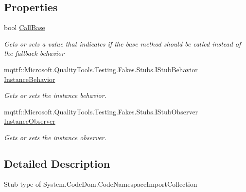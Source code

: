 \subsection*{Properties}
\begin{DoxyCompactItemize}
\item 
bool \hyperlink{class_system_1_1_code_dom_1_1_fakes_1_1_stub_code_namespace_import_collection_a6d384f6015b3aae536c40a97007813c7}{Call\-Base}
\begin{DoxyCompactList}\small\item\em Gets or sets a value that indicates if the base method should be called instead of the fallback behavior\end{DoxyCompactList}\item 
mqttf\-::\-Microsoft.\-Quality\-Tools.\-Testing.\-Fakes.\-Stubs.\-I\-Stub\-Behavior \hyperlink{class_system_1_1_code_dom_1_1_fakes_1_1_stub_code_namespace_import_collection_a26a2ffcbaf1e9f0f57be5593e3d33202}{Instance\-Behavior}
\begin{DoxyCompactList}\small\item\em Gets or sets the instance behavior.\end{DoxyCompactList}\item 
mqttf\-::\-Microsoft.\-Quality\-Tools.\-Testing.\-Fakes.\-Stubs.\-I\-Stub\-Observer \hyperlink{class_system_1_1_code_dom_1_1_fakes_1_1_stub_code_namespace_import_collection_a5428a04d1dac7ec8a672f59db729e37a}{Instance\-Observer}
\begin{DoxyCompactList}\small\item\em Gets or sets the instance observer.\end{DoxyCompactList}\end{DoxyCompactItemize}


\subsection{Detailed Description}
Stub type of System.\-Code\-Dom.\-Code\-Namespace\-Import\-Collection



